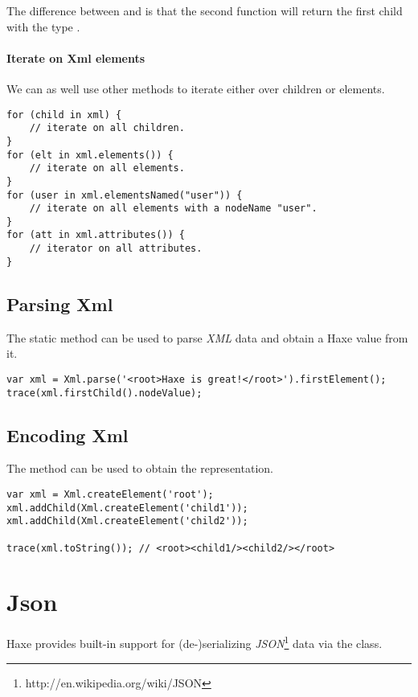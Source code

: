 The difference between  and  is that the second function will return the first child with the type . 

\paragraph{Iterate on Xml elements}
We can as well use other methods to iterate either over children or elements.
\begin{lstlisting}
for (child in xml) {
	// iterate on all children.
}
for (elt in xml.elements()) {
	// iterate on all elements.
}
for (user in xml.elementsNamed("user")) {
	// iterate on all elements with a nodeName "user".
}
for (att in xml.attributes()) {
	// iterator on all attributes.
}
\end{lstlisting}

\subsection{Parsing Xml}
\label{std-Xml-parsing}

The static method  can be used to parse \emph{XML} data and obtain a Haxe value from it.

\begin{lstlisting}
var xml = Xml.parse('<root>Haxe is great!</root>').firstElement();
trace(xml.firstChild().nodeValue);
\end{lstlisting}

\subsection{Encoding Xml}
\label{std-Xml-encoding}

The method  can be used to obtain the  representation.
\begin{lstlisting}
var xml = Xml.createElement('root');
xml.addChild(Xml.createElement('child1'));
xml.addChild(Xml.createElement('child2'));

trace(xml.toString()); // <root><child1/><child2/></root>
\end{lstlisting}

\section{Json}
\label{std-Json}

Haxe provides built-in support for (de-)serializing \emph{JSON}\footnote{http://en.wikipedia.org/wiki/JSON} data via the  class.

